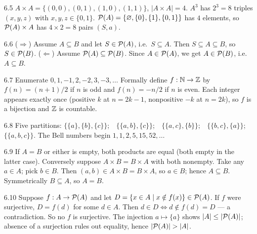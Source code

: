 \begin{solution}{6.5}
$A \times A = \{(0,0),(0,1),(1,0),(1,1)\}$, $|A \times A| = 4$.
$A^3$ has $2^3 = 8$ triples $(x,y,z)$ with $x,y,z \in \{0,1\}$.
$\mathcal{P}(A) = \{\varnothing,\{0\},\{1\},\{0,1\}\}$ has $4$ elements, so
$\mathcal{P}(A) \times A$ has $4 \times 2 = 8$ pairs $(S, a)$.
\end{solution}

\begin{solution}{6.6}
($\Rightarrow$) Assume $A \subseteq B$ and let $S \in \mathcal{P}(A)$, i.e.\
$S \subseteq A$. Then $S \subseteq A \subseteq B$, so
$S \in \mathcal{P}(B)$. ($\Leftarrow$) Assume
$\mathcal{P}(A) \subseteq \mathcal{P}(B)$. Since $A \in \mathcal{P}(A)$, we get
$A \in \mathcal{P}(B)$, i.e.\ $A \subseteq B$.
\end{solution}

\begin{solution}{6.7}
Enumerate $0, 1, -1, 2, -2, 3, -3, \ldots$ Formally define
$f : \mathbb{N} \to \mathbb{Z}$ by $f(n) = (n+1)/2$ if $n$ is odd and $f(n) = -n/2$ if $n$ is
even. Each integer appears exactly once (positive $k$ at $n = 2k-1$,
nonpositive $-k$ at $n = 2k$), so $f$ is a bijection and $\mathbb{Z}$ is countable.
\end{solution}

\begin{solution}{6.8}
Five partitions:
$\{\{a\},\{b\},\{c\}\}$;\ \
$\{\{a,b\},\{c\}\}$;\ \
$\{\{a,c\},\{b\}\}$;\ \
$\{\{b,c\},\{a\}\}$;\ \
$\{\{a,b,c\}\}$. The Bell numbers begin $1, 1, 2, 5, 15, 52, \ldots$
\end{solution}

\begin{solution}{6.9}
If $A = B$ or either is empty, both products are equal (both empty in the
latter case). Conversely suppose $A \times B = B \times A$ with both
nonempty. Take any $a \in A$; pick $b \in B$. Then $(a,b) \in A \times B =
B \times A$, so $a \in B$; hence $A \subseteq B$. Symmetrically
$B \subseteq A$, so $A = B$.
\end{solution}

\begin{solution}{6.10}
Suppose $f : A \to \mathcal{P}(A)$ and let
$D = \{x \in A \mid x \notin f(x)\} \in \mathcal{P}(A)$. If $f$ were
surjective, $D = f(d)$ for some $d \in A$. Then $d \in D \iff d \notin
f(d) = D$ --- a contradiction. So no $f$ is surjective. The injection
$a \mapsto \{a\}$ shows $|A| \leq |\mathcal{P}(A)|$; absence of a surjection
rules out equality, hence $|\mathcal{P}(A)| > |A|$.
\end{solution}
